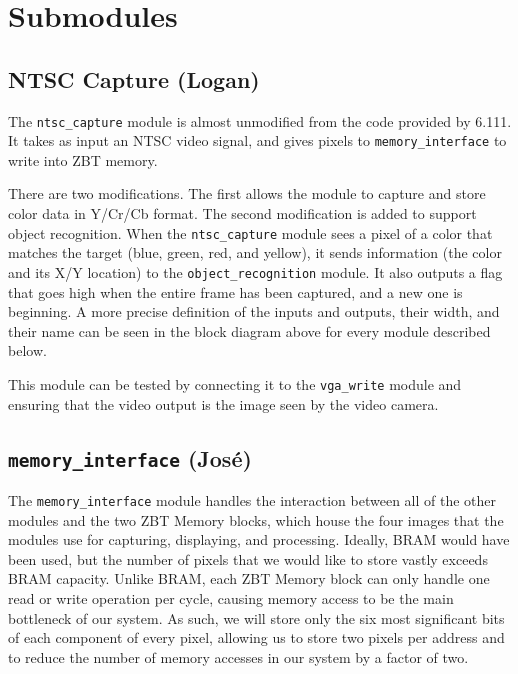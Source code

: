 \documentclass[10pt]{article}
\begin{document}
\section{Submodules}
\subsection{NTSC Capture (Logan)}
The {\tt ntsc\_capture} module is almost unmodified from the code provided by 6.111. It takes as input an NTSC video signal, and gives pixels to {\tt memory\_interface} to write into ZBT memory.

There are two modifications. The first allows the module to capture and store color data in Y/Cr/Cb format. The second modification is added to support object recognition. When the {\tt ntsc\_capture} module sees a pixel of a color that matches the target (blue, green, red, and yellow), it sends information (the color and its X/Y location) to the {\tt object\_recognition} module. It also outputs a flag that goes high when the entire frame has been captured, and a new one is beginning. A more precise definition of the inputs and outputs, their width, and their name can be seen in the block diagram above for every module described below.

This module can be tested by connecting it to the {\tt vga\_write} module and ensuring that the video output is the image seen by the video camera.

\subsection{{\tt memory\_interface} (Jos\'{e})}
The {\tt memory\_interface} module handles the interaction between all of the other modules and the two ZBT Memory blocks, which house the four images that the modules use for capturing, displaying, and processing. Ideally, BRAM would have been used, but the number of pixels that we would like to store vastly exceeds BRAM capacity. Unlike BRAM, each ZBT Memory block can only handle one read or write operation per cycle, causing memory access to be the main bottleneck of our system. As such, we will store only the six most significant bits of each component of every pixel, allowing us to store two pixels per address and to reduce the number of memory accesses in our system by a factor of two.
\end{document}

